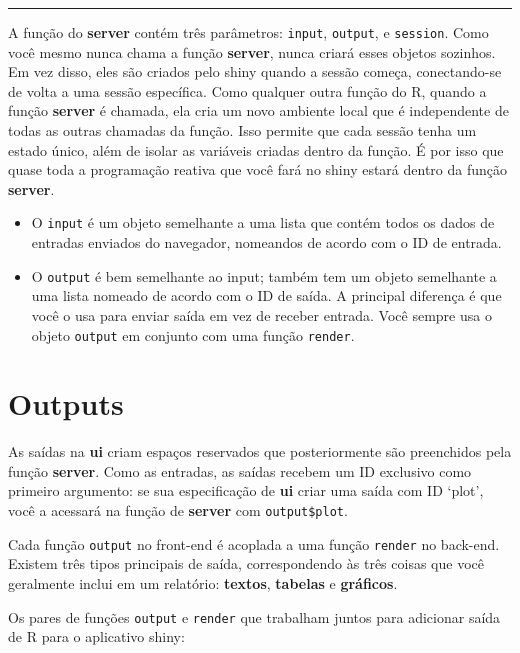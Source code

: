 \documentclass[
]{book}
\begin{document}
\begin{center}\rule{0.5\linewidth}{0.5pt}\end{center}

A função do \textbf{server} contém três parâmetros: \texttt{input}, \texttt{output}, e \texttt{session}. Como você mesmo nunca chama a função \textbf{server}, nunca criará esses objetos sozinhos. Em vez disso, eles são criados pelo shiny quando a sessão começa, conectando-se de volta a uma sessão específica. Como qualquer outra função do R, quando a função \textbf{server} é chamada, ela cria um novo ambiente local que é independente de todas as outras chamadas da função. Isso permite que cada sessão tenha um estado único, além de isolar as variáveis criadas dentro da função. É por isso que quase toda a programação reativa que você fará no shiny estará dentro da função \textbf{server}.

\begin{itemize}
\item
  O \texttt{input} é um objeto semelhante a uma lista que contém todos os dados de entradas enviados do navegador, nomeandos de acordo com o ID de entrada.
\item
  O \texttt{output} é bem semelhante ao input; também tem um objeto semelhante a uma lista nomeado de acordo com o ID de saída. A principal diferença é que você o usa para enviar saída em vez de receber entrada. Você sempre usa o objeto \texttt{output} em conjunto com uma função \texttt{render}.
\end{itemize}

\hypertarget{outputs}{%
\section{\texorpdfstring{\textbf{Outputs}}{Outputs}}\label{outputs}}

As saídas na \textbf{ui} criam espaços reservados que posteriormente são preenchidos pela função \textbf{server}. Como as entradas, as saídas recebem um ID exclusivo como primeiro argumento: se sua especificação de \textbf{ui} criar uma saída com ID `plot', você a acessará na função de \textbf{server} com \texttt{output\$plot}.

Cada função \texttt{output} no front-end é acoplada a uma função \texttt{render} no back-end. Existem três tipos principais de saída, correspondendo às três coisas que você geralmente inclui em um relatório: \textbf{textos}, \textbf{tabelas} e \textbf{gráficos}.

Os pares de funções \texttt{output} e \texttt{render} que trabalham juntos para adicionar saída de R para o aplicativo shiny:
\end{document}
